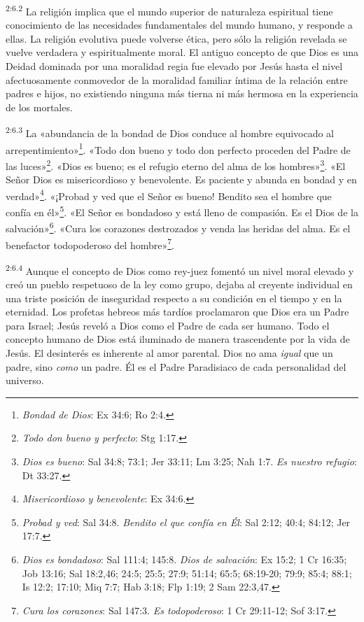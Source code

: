 \par
\textsuperscript{2:6.2} La religión implica que el mundo superior de naturaleza espiritual tiene conocimiento de las necesidades fundamentales del mundo humano, y responde a ellas. La religión evolutiva puede volverse ética, pero sólo la religión revelada se vuelve verdadera y espiritualmente moral. El antiguo concepto de que Dios es una Deidad dominada por una moralidad regia fue elevado por Jesús hasta el nivel afectuosamente conmovedor de la moralidad familiar íntima de la relación entre padres e hijos, no existiendo ninguna más tierna ni más hermosa en la experiencia de los mortales.

\par
\textsuperscript{2:6.3} La «abundancia de la bondad de Dios conduce al hombre equivocado al arrepentimiento»\footnote{\textit{Bondad de Dios}: Ex 34:6; Ro 2:4.}. «Todo don bueno y todo don perfecto proceden del Padre de las luces»\footnote{\textit{Todo don bueno y perfecto}: Stg 1:17.}. «Dios es bueno; es el refugio eterno del alma de los hombres»\footnote{\textit{Dios es bueno}: Sal 34:8; 73:1; Jer 33:11; Lm 3:25; Nah 1:7. \textit{Es nuestro refugio}: Dt 33:27.}. «El Señor Dios es misericordioso y benevolente. Es paciente y abunda en bondad y en verdad»\footnote{\textit{Misericordioso y benevolente}: Ex 34:6.}. «¡Probad y ved que el Señor es bueno! Bendito sea el hombre que confía en él»\footnote{\textit{Probad y ved}: Sal 34:8. \textit{Bendito el que confía en Él}: Sal 2:12; 40:4; 84:12; Jer 17:7.}. «El Señor es bondadoso y está lleno de compasión. Es el Dios de la salvación»\footnote{\textit{Dios es bondadoso}: Sal 111:4; 145:8. \textit{Dios de salvación}: Ex 15:2; 1 Cr 16:35; Job 13:16; Sal 18:2,46; 24:5; 25:5; 27:9; 51:14; 65:5; 68:19-20; 79:9; 85:4; 88:1; Is 12:2; 17:10; Miq 7:7; Hab 3:18; Flp 1:19; 2 Sam 22:3,47.}. «Cura los corazones destrozados y venda las heridas del alma. Es el benefactor todopoderoso del hombre»\footnote{\textit{Cura los corazones}: Sal 147:3. \textit{Es todopoderoso}: 1 Cr 29:11-12; Sof 3:17.}.

\par
\textsuperscript{2:6.4} Aunque el concepto de Dios como rey-juez fomentó un nivel moral elevado y creó un pueblo respetuoso de la ley como grupo, dejaba al creyente individual en una triste posición de inseguridad respecto a su condición en el tiempo y en la eternidad. Los profetas hebreos más tardíos proclamaron que Dios era un Padre para Israel; Jesús reveló a Dios como el Padre de cada ser humano. Todo el concepto humano de Dios está iluminado de manera trascendente por la vida de Jesús. El desinterés es inherente al amor parental. Dios no ama \textit{igual} que un padre, sino \textit{como} un padre. Él es el Padre Paradisiaco de cada personalidad del universo.


